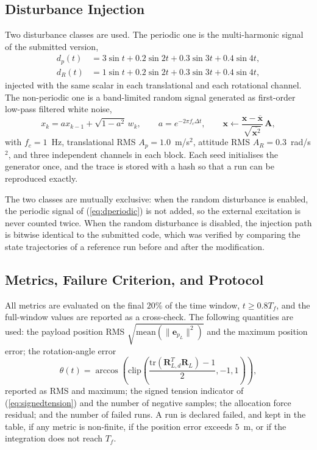 \documentclass[Review,sageh,times]{sagej}
\begin{document}
\subsection*{Disturbance Injection}

Two disturbance classes are used. The periodic one is the multi-harmonic
signal of the submitted version,
\begin{equation}
\begin{aligned}
d_p(t) &= 3\sin t + 0.2\sin 2t + 0.3\sin 3t + 0.4\sin 4t,\\
d_R(t) &= 1\sin t + 0.2\sin 2t + 0.3\sin 3t + 0.4\sin 4t,
\end{aligned}
\label{eq:dperiodic}
\end{equation}
injected with the same scalar in each translational and each rotational
channel. The non-periodic one is a band-limited random signal generated as
first-order low-pass filtered white noise,
\begin{equation}
x_k = a x_{k-1} + \sqrt{1-a^{2}}\,w_k,
\qquad
a=e^{-2\pi f_c\Delta t},
\qquad
\mathbf{x}\leftarrow\frac{\mathbf{x}-\overline{\mathbf{x}}}
{\sqrt{\overline{\mathbf{x}^{2}}}}\,\mathbf{A},
\label{eq:randomdist}
\end{equation}
with $f_c=1$~Hz, translational RMS $A_p=1.0$~m/s$^2$, attitude RMS
$A_R=0.3$~rad/s$^2$, and three independent channels in each block. Each seed
initialises the generator once, and the trace is stored with a hash so that a
run can be reproduced exactly.

The two classes are mutually exclusive: when the random disturbance is
enabled, the periodic signal of (\ref{eq:dperiodic}) is not added, so the external
excitation is never counted twice. When the random disturbance is disabled,
the injection path is bitwise identical to the submitted code, which was
verified by comparing the state trajectories of a reference run before and
after the modification.

\subsection*{Metrics, Failure Criterion, and Protocol}

All metrics are evaluated on the final $20\%$ of the time window,
$t\ge0.8T_f$, and the full-window values are reported as a cross-check. The
following quantities are used: the payload position RMS
$\sqrt{\mathrm{mean}(\|\mathbf{e}_{p_L}\|^2)}$ and the maximum position error; the
rotation-angle error
\begin{equation}
\theta(t) = \arccos\left(\mathrm{clip}\left(\frac{\mathrm{tr}(\mathbf{R}_{L,d}^{T}\mathbf{R}_L)-1}{2},-1,1\right)\right),
\label{eq:roterr}
\end{equation}
reported as RMS and maximum; the signed tension indicator of (\ref{eq:signedtension}) and
the number of negative samples; the allocation force residual; and the number
of failed runs. A run is declared failed, and kept in the table, if any metric is
non-finite, if the position error exceeds $5$~m, or if the integration does not
reach $T_f$.
\end{document}
